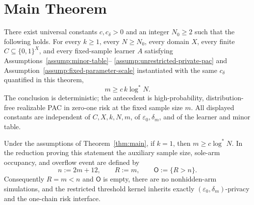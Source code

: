 \section{Main Theorem}
\label{sec:main-theorem}

\begin{theorem}
\label{thm:main}
There exist universal constants $c,c_\delta>0$ and an integer $N_0\geq2$
such that the following holds.  For every $k\geq1$, every $N\geq N_0$,
every domain $X$, every finite $C\subseteq\{0,1\}^X$, and every fixed-sample
learner $A$ satisfying Assumptions~\ref{assump:minor-table}--
\ref{assump:unrestricted-private-pac} and
Assumption~\ref{assump:fixed-parameter-scale} instantiated with the same
$c_\delta$ quantified in this theorem,
\[
m\geq c\,k\log^*N.
\]
The conclusion is deterministic; the antecedent is high-probability,
distribution-free realizable PAC in zero-one risk at the fixed sample size
$m$.  All displayed constants are independent of $C,X,k,N,m$, of
$\varepsilon_0,\delta_m$, and of the learner and minor table.
\end{theorem}

\begin{corollary}
\label{cor:one-chain}
Under the assumptions of Theorem~\ref{thm:main}, if $k=1$, then
$m\geq c\log^*N$.  In the reduction proving this statement the auxiliary
sample size, sole-arm occupancy, and overflow event are defined by
\[
n:=2m+12,\qquad R:=m,\qquad \mathsf O:=\{R>n\}.
\]
Consequently $R=m<n$ and $\mathsf O$ is empty, there are no nonhidden-arm
simulations, and the
restricted threshold kernel inherits exactly
$(\varepsilon_0,\delta_m)$-privacy and the one-chain risk interface.
\end{corollary}
